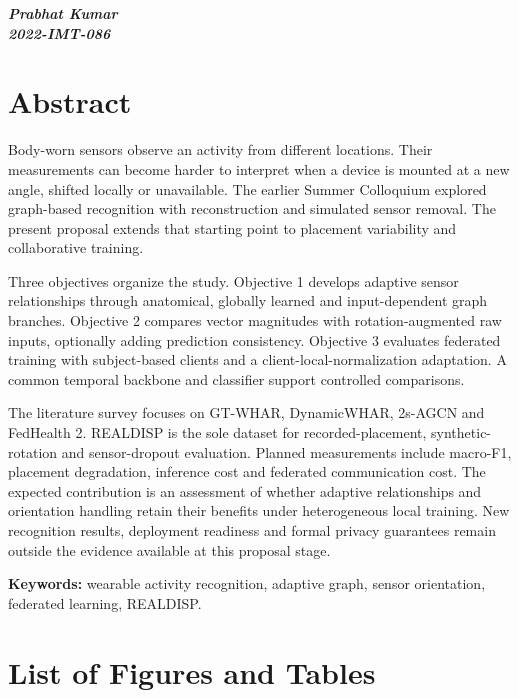 \documentclass[10pt,a4paper,oneside,openany]{report}
\newcommand{\studentname}{Prabhat Kumar}
\newcommand{\rollnumber}{2022-IMT-086}
\begin{document}
\vspace{1cm}
\begin{flushright}
\textit{\textbf{\studentname}}\\
\textit{\textbf{\rollnumber}}
\end{flushright}

\cleardoublepage
\chapter*{Abstract}

Body-worn sensors observe an activity from different locations. Their measurements can become harder to interpret when a device is mounted at a new angle, shifted locally or unavailable. The earlier Summer Colloquium explored graph-based recognition with reconstruction and simulated sensor removal. The present proposal extends that starting point to placement variability and collaborative training.

Three objectives organize the study. Objective 1 develops adaptive sensor relationships through anatomical, globally learned and input-dependent graph branches. Objective 2 compares vector magnitudes with rotation-augmented raw inputs, optionally adding prediction consistency. Objective 3 evaluates federated training with subject-based clients and a client-local-normalization adaptation. A common temporal backbone and classifier support controlled comparisons.

The literature survey focuses on GT-WHAR, DynamicWHAR, 2s-AGCN and FedHealth 2. REALDISP is the sole dataset for recorded-placement, synthetic-rotation and sensor-dropout evaluation. Planned measurements include macro-F1, placement degradation, inference cost and federated communication cost. The expected contribution is an assessment of whether adaptive relationships and orientation handling retain their benefits under heterogeneous local training. New recognition results, deployment readiness and formal privacy guarantees remain outside the evidence available at this proposal stage.

\noindent\textbf{Keywords:} wearable activity recognition, adaptive graph, sensor orientation, federated learning, REALDISP.

\cleardoublepage
\tableofcontents

\cleardoublepage
\chapter*{List of Figures and Tables}
\end{document}
